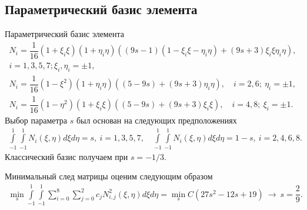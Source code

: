 \subsection{Параметрический базис элемента}
\begin{frame}{Параметрический базис элемента}
\begin{gather*}
    N_i = \dfrac{1}{16} (1 + \xi_i \xi) (1 + \eta_i \eta) ((9s - 1) (1 - \xi_i \xi - \eta_i \eta) + (9s + 3) \xi_i \xi \eta_i \eta), \\
    i = 1, 3, 5, 7; \xi_i, \eta_i = \pm 1, \\
    N_i = \dfrac{1}{16} (1 - \xi^2) (1 + \eta_i \eta) ((5 - 9s) + (9s + 3)\eta_i \eta),
    \quad
    i = 2, 6; \ \eta_i = \pm 1, \\
    N_i = \dfrac{1}{16} (1 - \eta^2) (1 + \xi_i \xi) ((5 - 9s) + (9s + 3)\xi_i \xi),
    \quad
    i = 4, 8; \ \xi_i = \pm 1.
\end{gather*}
Выбор параметра $s$ был основан на следующих предположениях
\begin{gather*}
    \int\limits_{-1}^{1} \int\limits_{-1}^{1} N_i (\xi, \eta) d\xi d\eta = s,
    \
    i = 1, 3, 5, 7, \quad
    \int\limits_{-1}^{1} \int\limits_{-1}^{1} N_i (\xi, \eta) d\xi d\eta = 1 - s,
    \
    i = 2, 4, 6, 8.
\end{gather*}
Классический базис получаем при $s = -1 / 3$.

Минимальный след матрицы оценим следующим образом
\begin{gather*}
	\label{eq:ParamSOptimal}
	\min\limits_s \int\limits_{-1}^{1} \int\limits_{-1}^{1} \sum\limits_{i = 0}^8 \sum\limits_{j = 0}^2 c_{j} N_{i, j}^2(\xi, \eta) d\xi d\eta =
	\min\limits_s C (27 s^2 -12 s + 19) \
	\rightarrow \ s = \dfrac{2}{9}.
\end{gather*}
\end{frame}


